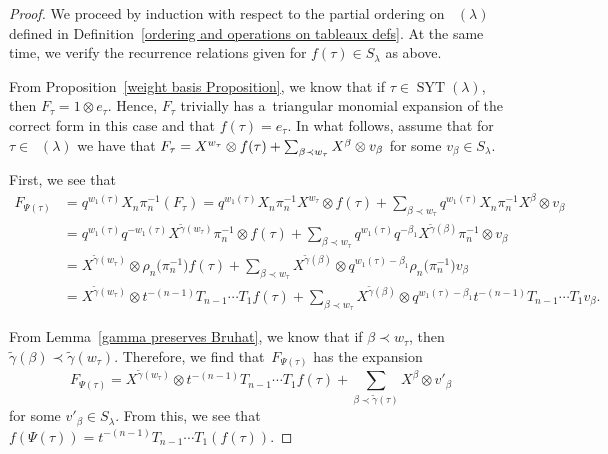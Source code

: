 \documentclass[10pt,a4paper]{amsart}
\numberwithin{equation}{section}
\theoremstyle{definition}
\DeclareMathOperator{\SYT}{\mathrm{SYT}}
\DeclareMathOperator{\PSYT}{\mathrm{PSYT}_{\geq 0}}
\begin{document}
\begin{proof}
 We proceed by induction with respect to the partial ordering on $\PSYT(\lambda)$ defined in Definition~\ref{ordering and operations on tableaux defs}. At the same time, we verify the recurrence relations given for $f(\tau) \in S_{\lambda}$ as above.

 From Proposition~\ref{weight basis Proposition}, we know that if $\tau \in \SYT(\lambda)$, then $F_{\tau} = 1\otimes e_{\tau}$. Hence, $F_{\tau}$ trivially has a~triangular monomial expansion of the correct form in this case and that $f(\tau) = e_{\tau}$.
 In what follows, assume that for $\tau \in \PSYT(\lambda)$ we have that
$
 F_{\tau} = X^{w_{\tau}}\otimes f(\tau) + \smash{\sum_{\beta \prec w_{\tau}} X^{\beta}}\otimes v_{\beta}
$
 for some $v_{\beta} \in S_\lambda$.

 First, we see that
 \begin{align*}
 F_{\Psi(\tau)}& = q^{w_1(\tau)}X_n \pi_n^{-1}(F_{\tau}) = q^{w_1(\tau)}X_n \pi_n^{-1}X^{w_{\tau}}\otimes f(\tau) + \sum_{\beta \prec w_{\tau}} q^{w_1(\tau)}X_n \pi_n^{-1}X^{\beta}\otimes v_{\beta} \\
 & = q^{w_1(\tau)}q^{-w_1(\tau)} X^{\widetilde{\gamma}(w_{\tau})} \pi_n^{-1} \otimes f(\tau) + \sum_{\beta \prec w_{\tau}} q^{w_1(\tau)}q^{-\beta_1}X^{\widetilde{\gamma}(\beta)}\pi_n^{-1}\otimes v_{\beta} \\
 & = X^{\widetilde{\gamma}(w_{\tau})} \otimes \rho_n\bigl(\pi_n^{-1}\bigr)f(\tau) + \sum_{\beta \prec w_{\tau}} X^{\widetilde{\gamma}(\beta)} \otimes q^{w_1(\tau)-\beta_1} \rho_n\bigl(\pi_n^{-1}\bigr)v_{\beta} \\
 &= X^{\widetilde{\gamma}(w_{\tau})} \otimes t^{-(n-1)}T_{n-1}\cdots T_1f(\tau) + \sum_{\beta \prec w_{\tau}} X^{\widetilde{\gamma}(\beta)} \otimes q^{w_1(\tau)-\beta_1} t^{-(n-1)}T_{n-1}\cdots T_1v_{\beta}.
 \end{align*}

 From Lemma~\ref{gamma preserves Bruhat}, we know that if $\beta \prec w_{\tau}$, then $\widetilde{\gamma}(\beta) \prec \widetilde{\gamma}(w_{\tau})$. Therefore, we find that~$F_{\Psi(\tau)}$ has the expansion
 \[
 F_{\Psi(\tau)} = X^{\widetilde{\gamma}(w_{\tau})} \otimes t^{-(n-1)}T_{n-1}\cdots T_1f(\tau) + \sum_{\beta \prec \widetilde{\gamma}(\tau)} X^{\beta} \otimes v'_{\beta}
 \]
 for some $v'_{\beta} \in S_{\lambda}$. From this, we see that $f(\Psi(\tau)) = t^{-(n-1)}T_{n-1}\cdots T_1(f(\tau))$.


\end{proof}
\end{document}
